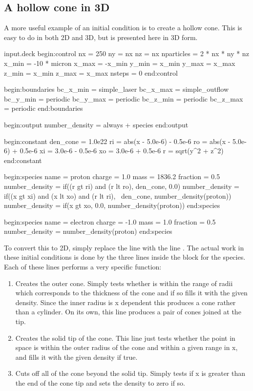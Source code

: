 \subsection{A hollow cone in 3D}
A more useful example of an initial condition is to create a hollow cone. This
is easy to do in both 2D and 3D, but is presented here in 3D form.
\begin{lboxverbatim}{input.deck}
begin:control
   nx = 250
   ny = nx
   nz = nx
   nparticles = 2 * nx * ny * nz
   x_min = -10 * micron
   x_max = -x_min
   y_min = x_min
   y_max = x_max
   z_min = x_min
   z_max = x_max
   nsteps = 0
end:control

begin:boundaries
   bc_x_min = simple_laser
   bc_x_max = simple_outflow
   bc_y_min = periodic
   bc_y_max = periodic
   bc_z_min = periodic
   bc_z_max = periodic
end:boundaries

begin:output
   number_density = always + species
end:output

begin:constant
   den_cone = 1.0e22
   ri = abs(x - 5.0e-6) - 0.5e-6
   ro = abs(x - 5.0e-6) + 0.5e-6
   xi = 3.0e-6 - 0.5e-6
   xo = 3.0e-6 + 0.5e-6
   r = sqrt(y^2 + z^2)
end:constant

begin:species
   name = proton
   charge = 1.0
   mass = 1836.2
   fraction = 0.5
   number_density = if((r gt ri) and (r lt ro), den_cone, 0.0)
   number_density = if((x gt xi) and (x lt xo) and (r lt ri), \
                       den_cone, number_density(proton))
   number_density = if(x gt xo, 0.0, number_density(proton))
end:species

begin:species
   name = electron
   charge = -1.0
   mass = 1.0
   fraction = 0.5
   number_density = number_density(proton)
end:species
\end{lboxverbatim}

To convert this to 2D, simply replace the line
 with the line . The
actual work in these initial conditions is done by the three lines inside the
block for the \inlineemph{Proton} species. Each of these lines performs a very
specific function:

\begin{enumerate}
\item Creates the outer cone. Simply tests whether  is within
  the range of radii which corresponds to the thickness of the cone and if so
  fills it with the given density. Since the inner radius is x dependent this
  produces a cone rather than a cylinder. On its own, this line produces a
  pair of cones joined at the tip.
\item Creates the solid tip of the cone. This line just tests whether the
  point in space is within the outer radius of the cone and within a given
  range in x, and fills it with the given density if true.
\item Cuts off all of the cone beyond the solid tip. Simply tests if x is
  greater than the end of the cone tip and sets the density to zero if so.
\end{enumerate}

